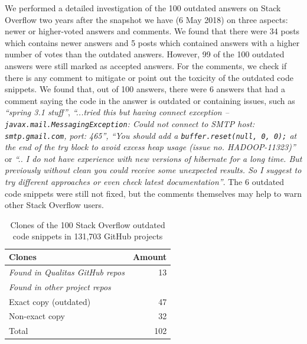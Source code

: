 \documentclass[10pt,journal,compsoc]{IEEEtran}
\begin{document}
We performed a detailed investigation of the 100 outdated answers on Stack
Overflow two years after the snapshot we have (6 May 2018) 
on three aspects: newer or higher-voted answers and comments. We found
that there were 34 posts which contains newer answers and 5 posts which contained answers with a higher number of
votes than the outdated answers. However, 99 of the 100 outdated answers were still
marked as accepted answers. For the comments, we check if there is any comment
to mitigate or point out the toxicity of the outdated code snippets. We found
that, out of 100 answers, there were 6 answers that had a comment saying the
code in the answer is outdated or containing issues, such as \textit{``spring
	3.1 stuff''}, \textit{``...tried this but having connect exception --
	\texttt{javax.mail.MessagingException}:\textit{ Could not connect to SMTP host:
	\texttt{smtp.gmail.com}, port: 465''}, ``You should add a \texttt{buffer.reset(null, 0, 0);} at the end of the try block to avoid excess heap usage (issue no. HADOOP-11323)''} or \textit{``.. I do not have experience
	with new versions of hibernate for a long time. But previously without clean you
	could receive some unexpected results. So I suggest to try different approaches
	or even check latest documentation''}. The 6 outdated code snippets were still
not fixed, but the comments themselves may help to warn other Stack Overflow
users.

\begin{table}
\centering
\label{tab:outdated_github}
\begin{tabular}{lr}
	\toprule
	Clones & Amount \\
	\midrule
	\textit{Found in Qualitas GitHub repos} & 13 \\
	\midrule
	\textit{Found in other project repos} & \\
	Exact copy (outdated) & 47 \\
	Non-exact copy & 32 \\
	\midrule
	Total & 102 \\
	\bottomrule
\end{tabular}
	\caption{Clones of the 100 Stack Overflow outdated code snippets in 131,703 GitHub projects}
\end{table}
\end{document}

